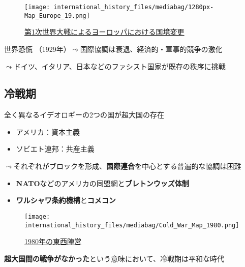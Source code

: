\documentclass[
  xelatex,
  ja=standard]{bxjsarticle}
\providecommand{\tightlist}{%
  \setlength{\itemsep}{0pt}\setlength{\parskip}{0pt}}\usepackage{longtable,booktabs,array}
\begin{document}
\begin{figure}[htpb]

{\centering \texttt{[image: international\_history\_files/mediabag/1280px-Map\_Europe\_19.png]}

}

\caption{\href{https://commons.wikimedia.org/wiki/File:Map_Europe_1923-en.svg}{第1次世界大戦によるヨーロッパにおける国境変更}}

\end{figure}

世界恐慌 （1929年）\(\leadsto\)国際協調は衰退、経済的・軍事的競争の激化

\(\leadsto\)ドイツ、イタリア、日本などのファシスト国家が既存の秩序に挑戦

\hypertarget{ux51b7ux6226ux671f}{%
\subsection{冷戦期}\label{ux51b7ux6226ux671f}}

全く異なるイデオロギーの2つの国が超大国の存在

\begin{itemize}
\tightlist
\item
  アメリカ：資本主義
\item
  ソビエト連邦：共産主義
\end{itemize}

\(\leadsto\)それぞれがブロックを形成、\textbf{国際連合}を中心とする普遍的な協調は困難

\begin{itemize}
\tightlist
\item
  \textbf{NATO}などのアメリカの同盟網と\textbf{ブレトンウッズ体制}
\item
  \textbf{ワルシャワ条約機構}と\textbf{コメコン}
\end{itemize}

\begin{figure}[htpb]

{\centering \texttt{[image: international\_history\_files/mediabag/Cold\_War\_Map\_1980.png]}

}

\caption{\href{https://commons.wikimedia.org/wiki/File:Cold_War_Map_1980.png}{1980年の東西陣営}}

\end{figure}

\textbf{超大国間の戦争がなかった}という意味において、冷戦期は平和な時代
\end{document}
